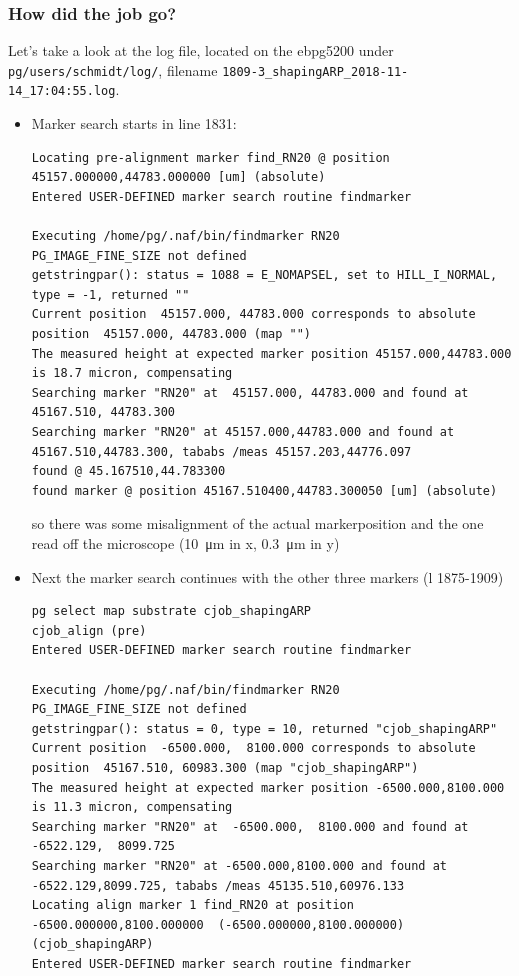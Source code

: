 \subsubsection{How did the job go?}
Let's take a look at the log file, located on the ebpg5200 under \lstinline|pg/users/schmidt/log/|, filename \lstinline|1809-3_shapingARP_2018-11-14_17:04:55.log|.
\begin{itemize}
	\item Marker search starts in line 1831:

\begin{lstlisting}
Locating pre-alignment marker find_RN20 @ position 45157.000000,44783.000000 [um] (absolute)
Entered USER-DEFINED marker search routine findmarker

Executing /home/pg/.naf/bin/findmarker RN20
PG_IMAGE_FINE_SIZE not defined
getstringpar(): status = 1088 = E_NOMAPSEL, set to HILL_I_NORMAL, type = -1, returned ""
Current position  45157.000, 44783.000 corresponds to absolute position  45157.000, 44783.000 (map "")
The measured height at expected marker position 45157.000,44783.000 is 18.7 micron, compensating
Searching marker "RN20" at  45157.000, 44783.000 and found at  45167.510, 44783.300
Searching marker "RN20" at 45157.000,44783.000 and found at 45167.510,44783.300, tababs /meas 45157.203,44776.097
found @ 45.167510,44.783300
found marker @ position 45167.510400,44783.300050 [um] (absolute)
\end{lstlisting}
so there was some misalignment of the actual markerposition and the one read off the microscope (\SI{10}{\micro\meter} in x, \SI{0.3}{\micro\meter} in y)

\item Next the marker search continues with the other three markers (l 1875-1909)

\begin{lstlisting}
pg select map substrate cjob_shapingARP
cjob_align (pre)
Entered USER-DEFINED marker search routine findmarker

Executing /home/pg/.naf/bin/findmarker RN20
PG_IMAGE_FINE_SIZE not defined
getstringpar(): status = 0, type = 10, returned "cjob_shapingARP"
Current position  -6500.000,  8100.000 corresponds to absolute position  45167.510, 60983.300 (map "cjob_shapingARP")
The measured height at expected marker position -6500.000,8100.000 is 11.3 micron, compensating
Searching marker "RN20" at  -6500.000,  8100.000 and found at  -6522.129,  8099.725
Searching marker "RN20" at -6500.000,8100.000 and found at -6522.129,8099.725, tababs /meas 45135.510,60976.133
Locating align marker 1 find_RN20 at position -6500.000000,8100.000000  (-6500.000000,8100.000000) (cjob_shapingARP)
Entered USER-DEFINED marker search routine findmarker


\end{lstlisting}
\end{itemize}
